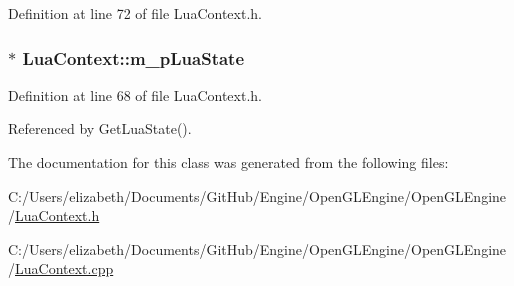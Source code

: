 Definition at line 72 of file Lua\+Context.\+h.

\subsubsection[{\texorpdfstring{m\+\_\+p\+Lua\+State}{m_pLuaState}}]{$\ast$ Lua\+Context\+::m\+\_\+p\+Lua\+State\hspace{0.3cm}{\ttfamily [private]}}\hypertarget{class_lua_context_a96ad96f37f625e4a5ca50368ce22a47b}{}\label{class_lua_context_a96ad96f37f625e4a5ca50368ce22a47b}


Definition at line 68 of file Lua\+Context.\+h.



Referenced by Get\+Lua\+State().



The documentation for this class was generated from the following files\+:\begin{DoxyCompactItemize}
\item 
C\+:/\+Users/elizabeth/\+Documents/\+Git\+Hub/\+Engine/\+Open\+G\+L\+Engine/\+Open\+G\+L\+Engine/\hyperlink{_lua_context_8h}{Lua\+Context.\+h}\item 
C\+:/\+Users/elizabeth/\+Documents/\+Git\+Hub/\+Engine/\+Open\+G\+L\+Engine/\+Open\+G\+L\+Engine/\hyperlink{_lua_context_8cpp}{Lua\+Context.\+cpp}\end{DoxyCompactItemize}
